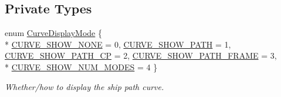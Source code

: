 \subsection*{Private Types}
\begin{DoxyCompactItemize}
\item 
enum \hyperlink{classSolar__viewer_a81992414d6b7f79184b903adffca6d88}{Curve\+Display\+Mode} \{ \\*
\hyperlink{classSolar__viewer_a81992414d6b7f79184b903adffca6d88a1397cb671bd96a0a15c241617fea99e9}{C\+U\+R\+V\+E\+\_\+\+S\+H\+O\+W\+\_\+\+N\+O\+NE} = 0, 
\hyperlink{classSolar__viewer_a81992414d6b7f79184b903adffca6d88a258c35298f28a01bfaa1c18ce9df3fa8}{C\+U\+R\+V\+E\+\_\+\+S\+H\+O\+W\+\_\+\+P\+A\+TH} = 1, 
\hyperlink{classSolar__viewer_a81992414d6b7f79184b903adffca6d88a44157ba65d88263416f5f1b6c9b83d71}{C\+U\+R\+V\+E\+\_\+\+S\+H\+O\+W\+\_\+\+P\+A\+T\+H\+\_\+\+CP} = 2, 
\hyperlink{classSolar__viewer_a81992414d6b7f79184b903adffca6d88a561ebf84867cf9734de69a2f0a31b255}{C\+U\+R\+V\+E\+\_\+\+S\+H\+O\+W\+\_\+\+P\+A\+T\+H\+\_\+\+F\+R\+A\+ME} = 3, 
\\*
\hyperlink{classSolar__viewer_a81992414d6b7f79184b903adffca6d88a0e7f84c9f071589c0cbcc9f0a50f0e6a}{C\+U\+R\+V\+E\+\_\+\+S\+H\+O\+W\+\_\+\+N\+U\+M\+\_\+\+M\+O\+D\+ES} = 4
 \}\begin{DoxyCompactList}\small\item\em Whether/how to display the ship path curve. \end{DoxyCompactList}
\end{DoxyCompactItemize}
